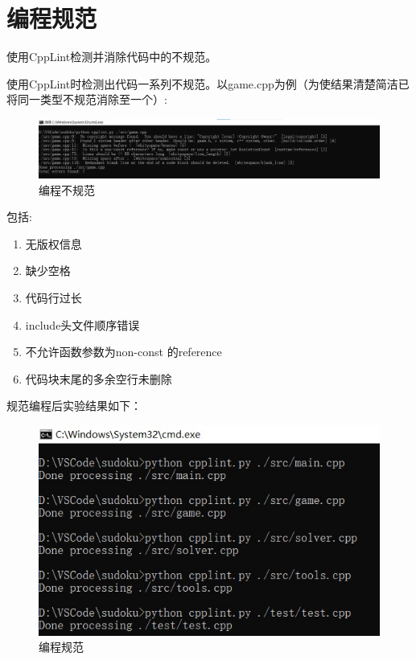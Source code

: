 \documentclass[a4paper]{article}
\begin{document}
\section{编程规范}
使用CppLint检测并消除代码中的不规范。

使用CppLint时检测出代码一系列不规范。以game.cpp为例（为使结果清楚简洁已将同一类型不规范消除至一个）:
\begin{figure}[!ht]
  \centering
  \includegraphics[scale=0.5]{images/ncpplint.jpg}
  \caption{编程不规范}
  \label{fig:ncpplint}
\end{figure}

包括:

\begin{enumerate}
	\item 无版权信息
	\item 缺少空格
	\item 代码行过长
	\item include头文件顺序错误
	\item 不允许函数参数为non-const 的reference
	\item 代码块末尾的多余空行未删除
\end{enumerate}

规范编程后实验结果如下：

\begin{figure}[!ht]
  \centering
  \includegraphics[scale=0.9]{images/cpplint.jpg}
  \caption{编程规范}
  \label{fig:cpplint}
\end{figure}
\end{document}
